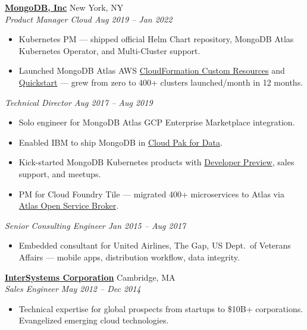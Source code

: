 \documentclass[10pt,letterpaper]{article}
\begin{document}
\textbf{\href{https://www.mongodb.com/}{MongoDB, Inc}} \hfill {\small\color{lighttext} New York, NY}\\
{\small\itshape\color{accent} Product Manager Cloud \hfill Aug 2019 -- Jan 2022}
\begin{itemize}
\item {\small Kubernetes PM --- shipped official Helm Chart repository, MongoDB Atlas Kubernetes Operator, and Multi-Cluster support.}
\item {\small Launched MongoDB Atlas AWS \href{https://github.com/mongodb/mongodbatlas-cloudformation-resources}{CloudFormation Custom Resources} and \href{https://aws.amazon.com/quickstart/architecture/mongodb-atlas/}{Quickstart} --- grew from zero to 400+ clusters launched/month in 12 months.}
\end{itemize}

{\small\itshape\color{accent} Technical Director \hfill Aug 2017 -- Aug 2019}
\begin{itemize}
\item {\small Solo engineer for MongoDB Atlas GCP Enterprise Marketplace integration.}
\item {\small Enabled IBM to ship MongoDB in \href{https://www.ibm.com/products/cloud-pak-for-data}{Cloud Pak for Data}.}
\item {\small Kick-started MongoDB Kubernetes products with \href{https://cloud.redhat.com/blog/dev-preview-mongodb-enterprise-running-on-openshift}{Developer Preview}, sales support, and meetups.}
\item {\small PM for Cloud Foundry Tile --- migrated 400+ microservices to Atlas via \href{https://github.com/mongodb/atlas-osb}{Atlas Open Service Broker}.}
\end{itemize}

{\small\itshape\color{accent} Senior Consulting Engineer \hfill Jan 2015 -- Aug 2017}
\begin{itemize}
\item {\small Embedded consultant for United Airlines, The Gap, US Dept.\ of Veterans Affairs --- mobile apps, distribution workflow, data integrity.}
\end{itemize}

\textbf{\href{http://www.intersystems.com/}{InterSystems Corporation}} \hfill {\small\color{lighttext} Cambridge, MA}\\
{\small\itshape\color{accent} Sales Engineer \hfill May 2012 -- Dec 2014}
\begin{itemize}
\item {\small Technical expertise for global prospects from startups to \$10B+ corporations. Evangelized emerging cloud technologies.}
\end{itemize}
\end{document}

